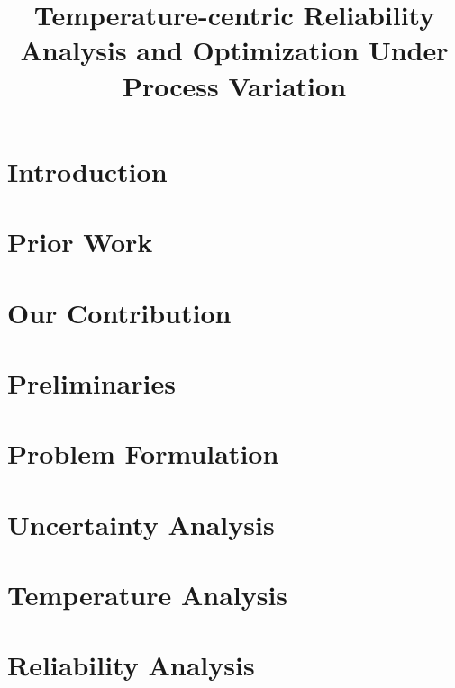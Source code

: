 \documentclass[conference]{IEEEtran}
\title{Temperature-centric Reliability Analysis and Optimization Under Process Variation}
\author{}
\begin{document}
  \maketitle

  \begin{abstract}
    
  \end{abstract}


  \section{Introduction} 
  

  \section{Prior Work} 
  

  \section{Our Contribution} 
  

  \section{Preliminaries} 
  

  \section{Problem Formulation} 
  

  \section{Uncertainty Analysis} 
  

  \section{Temperature Analysis} 
  

  \section{Reliability Analysis} 
\end{document}
